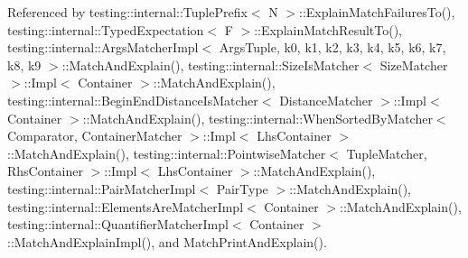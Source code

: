 Referenced by testing\+::internal\+::\+Tuple\+Prefix$<$ N $>$\+::\+Explain\+Match\+Failures\+To(), testing\+::internal\+::\+Typed\+Expectation$<$ F $>$\+::\+Explain\+Match\+Result\+To(), testing\+::internal\+::\+Args\+Matcher\+Impl$<$ Args\+Tuple, k0, k1, k2, k3, k4, k5, k6, k7, k8, k9 $>$\+::\+Match\+And\+Explain(), testing\+::internal\+::\+Size\+Is\+Matcher$<$ Size\+Matcher $>$\+::\+Impl$<$ Container $>$\+::\+Match\+And\+Explain(), testing\+::internal\+::\+Begin\+End\+Distance\+Is\+Matcher$<$ Distance\+Matcher $>$\+::\+Impl$<$ Container $>$\+::\+Match\+And\+Explain(), testing\+::internal\+::\+When\+Sorted\+By\+Matcher$<$ Comparator, Container\+Matcher $>$\+::\+Impl$<$ Lhs\+Container $>$\+::\+Match\+And\+Explain(), testing\+::internal\+::\+Pointwise\+Matcher$<$ Tuple\+Matcher, Rhs\+Container $>$\+::\+Impl$<$ Lhs\+Container $>$\+::\+Match\+And\+Explain(), testing\+::internal\+::\+Pair\+Matcher\+Impl$<$ Pair\+Type $>$\+::\+Match\+And\+Explain(), testing\+::internal\+::\+Elements\+Are\+Matcher\+Impl$<$ Container $>$\+::\+Match\+And\+Explain(), testing\+::internal\+::\+Quantifier\+Matcher\+Impl$<$ Container $>$\+::\+Match\+And\+Explain\+Impl(), and Match\+Print\+And\+Explain().



